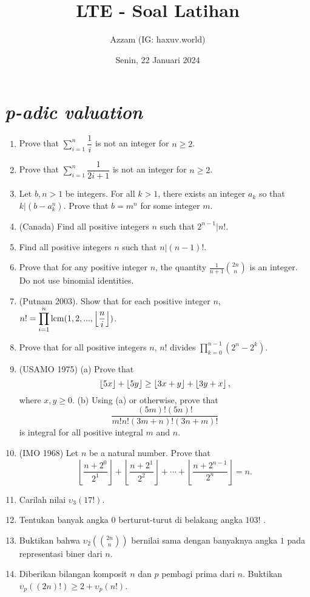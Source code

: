 \documentclass[11pt]{scrartcl}
\title{LTE - Soal Latihan}
\author{Azzam (IG: haxuv.world)}
\date{Senin, 22 Januari 2024}
\begin{document}
\maketitle
\section{\textit{p-adic valuation}}
\begin{enumerate}
    \item Prove that $\displaystyle\sum_{i=1}^{n} \dfrac{1}{i}$ is not an integer for $n \geq 2$.
    
    \item Prove that $\displaystyle\sum_{i=1}^{n} \dfrac{1}{2i+1}$ is not an integer for $n \geq 2$.
    
    \item Let $b, n > 1$ be integers. For all $k > 1$, there exists an integer $a_k$ so that $k | (b-a_k^n)$. Prove that $b = m^n$ for some integer $m$.
    
    \item (Canada) Find all positive integers $n$ such that $2^{n-1}|n!$.
    
    \item Find all positive integers $n$ such that $n | (n-1)!$.
    
    \item Prove that for any positive integer $n$, the quantity $\frac{1}{n+1}\binom{2n}{n}$ is an integer. Do not use binomial identities.
    
    \item (Putnam 2003). Show that for each positive integer $n$, $n! = \displaystyle\prod_{i=1}^n \operatorname{lcm}(1,2,...,\left\lfloor \frac{n}{i} \right\rfloor)$.
    
    \item Prove that for all positive integers $n$, $n!$ divides $\displaystyle\prod_{k=0}^{n-1} (2^n-2^k)$.
    
    \item (USAMO 1975) (a) Prove that \[ \left\lfloor 5x \right\rfloor+\left\lfloor 5y \right\rfloor \ge \left\lfloor 3x+y \right\rfloor+\left\lfloor 3y+x \right\rfloor,\] where $ x,y \ge 0$.
    (b) Using (a) or otherwise, prove that \[ \frac{(5m)!(5n)!}{m!n!(3m+n)!(3n+m)!}\] is integral for all positive integral $ m$ and $ n$. 

    \item (IMO 1968) Let $n$ be a natural number. Prove that\[ \left\lfloor \frac{n+2^0}{2^1} \right\rfloor + \left\lfloor \frac{n+2^1}{2^2} \right\rfloor +\cdots +\left\lfloor \frac{n+2^{n-1}}{2^n}\right\rfloor =n. \]
    
    \item Carilah nilai $\upsilon_3(17!)$.
    
    \item Tentukan banyak angka 0 berturut-turut di belakang angka $103!$ .
    
    \item Buktikan bahwa $\upsilon_2(\binom{2n}{n})$ bernilai sama dengan banyaknya angka $1$ pada representasi biner dari $n$.
    
    \item Diberikan bilangan komposit $n$ dan $p$ pembagi prima dari $n$. Buktikan $\upsilon_p((2n)!) \geq 2+\upsilon_p(n!)$.
\end{enumerate}
\end{document}
